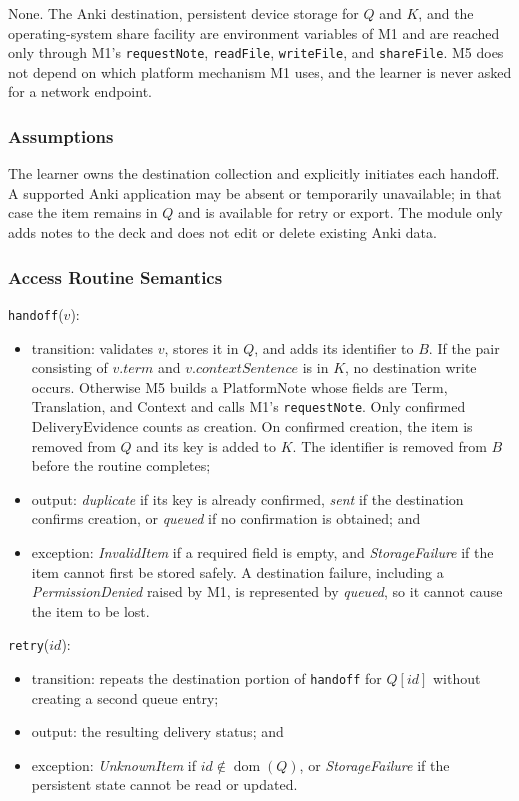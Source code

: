 \documentclass[12pt, titlepage]{article}
\begin{document}
None.  The Anki destination, persistent device storage for $Q$ and $K$, and
the operating-system share facility are environment variables of M1 and are
reached only through M1's \texttt{requestNote}, \texttt{readFile},
\texttt{writeFile}, and \texttt{shareFile}.  M5 does not depend on which
platform mechanism M1 uses, and the learner is never asked for a network
endpoint.

\subsubsection{Assumptions}

The learner owns the destination collection and explicitly initiates each
handoff.  A supported Anki application may be absent or temporarily
unavailable; in that case the item remains in $Q$ and is available for retry or
export.  The module only adds notes to the \progname{} deck and does not edit or
delete existing Anki data.

\subsubsection{Access Routine Semantics}

\noindent \texttt{handoff}($v$):
\begin{itemize}
  \item transition: validates $v$, stores it in $Q$, and adds its identifier to
  $B$.  If the pair consisting of $v.term$ and $v.contextSentence$ is in $K$, no
  destination write occurs.  Otherwise M5 builds a $\mathrm{PlatformNote}$
  whose fields are Term, Translation, and Context and calls M1's
  \texttt{requestNote}.  Only confirmed $\mathrm{DeliveryEvidence}$ counts as
  creation.  On confirmed creation, the item is removed from
  $Q$ and its key is added to $K$.  The identifier is removed from $B$ before
  the routine completes;
  \item output: \textit{duplicate} if its key is already confirmed,
  \textit{sent} if the destination confirms creation, or \textit{queued} if no
  confirmation is obtained; and
  \item exception: \textit{InvalidItem} if a required field is empty, and
  \textit{StorageFailure} if the item cannot first be stored safely.  A
  destination failure, including a \textit{PermissionDenied} raised by M1, is
  represented by \textit{queued}, so it cannot cause the item to be lost.
\end{itemize}

\noindent \texttt{retry}($id$):
\begin{itemize}
  \item transition: repeats the destination portion of \texttt{handoff} for
  $Q[id]$ without creating a second queue entry;
  \item output: the resulting delivery status; and
  \item exception: \textit{UnknownItem} if $id \notin \operatorname{dom}(Q)$,
  or \textit{StorageFailure} if the persistent state cannot be read or updated.
\end{itemize}
\end{document}
